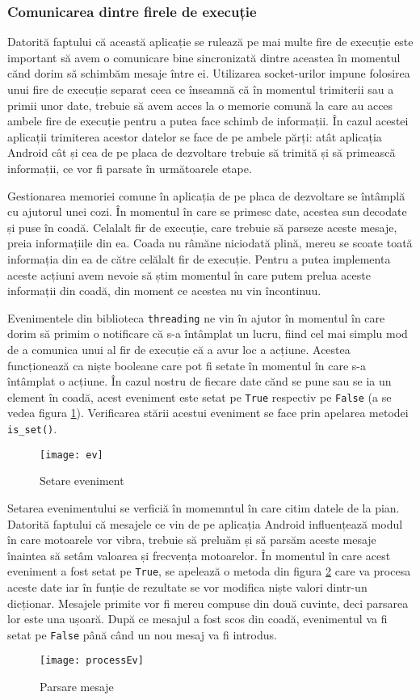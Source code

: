 \documentclass[../IoMusT.tex]{subfiles}
\begin{document}
\subsubsection{Comunicarea dintre firele de execuție} 
Datorită faptului că această aplicație se rulează pe mai multe fire de execuție este important să avem o comunicare bine sincronizată dintre aceastea în momentul cănd dorim să schimbăm mesaje între ei. Utilizarea socket-urilor impune folosirea unui fire de execuție separat ceea ce înseamnă că în momentul trimiterii sau a primii unor date, trebuie să avem acces la o memorie comună la care au acces ambele fire de execuție pentru a putea face schimb de informații. În cazul acestei aplicații trimiterea acestor datelor se face de pe ambele părți: atât aplicația Android cât și cea de pe placa de dezvoltare trebuie să trimită și să primească informații, ce vor fi parsate în următoarele etape.
\\
\par Gestionarea memoriei comune în aplicația de pe placa de dezvoltare se întâmplă cu ajutorul unei cozi. În momentul în care se primesc date, acestea sun decodate și puse în coadă. Celalalt fir de execuție, care trebuie să parseze aceste mesaje, preia informațiile din ea. Coada nu râmăne niciodată plină, mereu se scoate toată informația din ea de către celălalt fir de execuție. Pentru a putea implementa aceste acțiuni avem nevoie să știm momentul în care putem prelua aceste informații din coadă, din moment ce acestea nu vin încontinuu.
\\
\par Evenimentele din biblioteca \verb|threading| ne vin în ajutor în momentul în care dorim să primim o notificare că s-a întâmplat un lucru, fiind cel mai simplu mod de a comunica unui al fir de execuție că a avur loc a acțiune. Acestea funcționează ca niște booleane care pot fi setate în momentul în care s-a întâmplat o acțiune. În cazul nostru de fiecare date cănd se pune sau se ia un element în coadă, acest eveniment este setat pe \verb|True| respectiv pe \verb|False|  (a se vedea figura \ref{fig:ev}). Verificarea stării acestui eveniment se face prin apelarea metodei \verb|is_set()|.
\begin{figure}[h]
\centering
\texttt{[image: ev]}
\caption{Setare eveniment}
\label{fig:ev}
\end{figure}  
Setarea evenimentului se verficiă în momemntul în care citim datele de la pian. Datorită faptului că mesajele ce vin de pe aplicația Android influențează modul în care motoarele vor vibra, trebuie să preluăm și să parsăm aceste mesaje înaintea să setâm valoarea și frecvența motoarelor. În momentul în care acest eveniment a fost setat pe \verb|True|, se apelează o metoda din figura \ref{fig:processEv} care va procesa aceste date iar în funție de rezultate se vor modifica niște valori dintr-un dicționar. Mesajele primite vor fi mereu compuse din două cuvinte, deci parsarea lor este una ușoară. După ce mesajul a fost scos din coadă, evenimentul va fi setat pe \verb|False| până când un nou mesaj va fi introdus.
\begin{figure}[h]
\centering
\texttt{[image: processEv]}
\caption{Parsare mesaje}
\label{fig:processEv}
\end{figure}  
\end{document}
